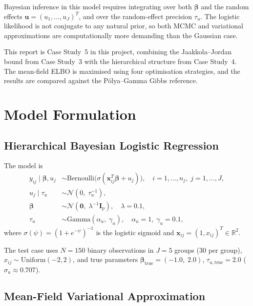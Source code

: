 \documentclass[11pt,a4paper]{article}
\newcommand{\R}{\mathbb{R}}
\newcommand{\N}{\mathcal{N}}
\newcommand{\sigmoid}{\sigma}
\begin{document}
Bayesian inference in this model requires integrating over both $\bm{\beta}$ and
the random effects $\mathbf{u} = (u_1,\ldots,u_J)^T$, and over the random-effect
precision $\tau_u$.
The logistic likelihood is not conjugate to any natural prior, so both MCMC and
variational approximations are computationally more demanding than the Gaussian case.

This report is Case Study~5 in this project, combining the Jaakkola--Jordan bound
from Case Study~3 with the hierarchical structure from Case Study~4.
The mean-field ELBO is maximised using four optimisation strategies, and the results
are compared against the P\'{o}lya--Gamma Gibbs reference.

\section{Model Formulation}

\subsection{Hierarchical Bayesian Logistic Regression}

The model is
\begin{align}
  y_{ij} \mid \bm{\beta}, u_j
    &\sim \mathrm{Bernoulli}\!\bigl(\sigmoid(\mathbf{x}_{ij}^T\bm{\beta} + u_j)\bigr),
    \quad i=1,\ldots,n_j,\; j=1,\ldots,J,\\
  u_j \mid \tau_u &\sim \mathcal{N}(0,\; \tau_u^{-1}),\\
  \bm{\beta} &\sim \N(\bm{0},\; \lambda^{-1}\bm{I}_p), \quad \lambda=0.1,\\
  \tau_u &\sim \mathrm{Gamma}(\alpha_u,\; \gamma_u), \quad \alpha_u=1, \;\gamma_u=0.1,
\end{align}
where $\sigmoid(\psi)=(1+e^{-\psi})^{-1}$ is the logistic sigmoid and
$\mathbf{x}_{ij} = (1, x_{ij})^T \in \R^2$.

The test case uses $N=150$ binary observations in $J=5$ groups (30 per group),
$x_{ij} \sim \mathrm{Uniform}(-2,2)$, and true parameters
$\bm{\beta}_{\mathrm{true}} = (-1.0,\; 2.0)$,
$\tau_{u,\mathrm{true}}=2.0$ ($\sigma_u \approx 0.707$).

\subsection{Mean-Field Variational Approximation}
\end{document}
